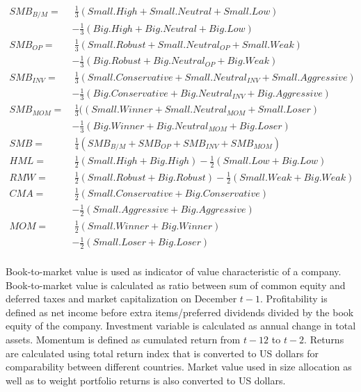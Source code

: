 \documentclass{article}
\begin{document}
\begin{equation} \label{eq:FF6factors}
\begin{split}
SMB_{B/M} = & \ \frac{1}{3} (Small.High + Small.Neutral + Small.Low) \\
			& - \frac{1}{3} (Big.High + Big.Neutral + Big.Low) \\[5pt]
SMB_{OP} = & \ \frac{1}{3} (Small.Robust + Small.Neutral_{OP} + Small.Weak)\\
			& - \frac{1}{3} (Big.Robust + Big.Neutral_{OP} + Big.Weak)\\[5pt]
SMB_{INV} = & \ \frac{1}{3} (Small.Conservative + Small.Neutral_{INV} + Small.Aggressive)\\
			& - \frac{1}{3} (Big.Conservative + Big.Neutral_{INV} + Big.Aggressive)\\[5pt]
SMB_{MOM} = & \ \frac{1}{3} ((Small.Winner + Small.Neutral_{MOM} + Small.Loser)\\
		     	& - \frac{1}{3} (Big.Winner + Big.Neutral_{MOM} + Big.Loser)\\[5pt]
SMB = & \ \frac{1}{4} (SMB_{B/M} + SMB_{OP} + SMB_{INV} + SMB_{MOM})\\[20pt]
HML = & \ \frac{1}{2} (Small.High + Big.High) - \frac{1}{2} (Small.Low + Big.Low)\\[5pt]
RMW = & \ \frac{1}{2} (Small.Robust + Big.Robust) - \frac{1}{2} (Small.Weak + Big.Weak)\\[5pt]
CMA = & \ \frac{1}{2} (Small.Conservative + Big.Conservative)\\
		& - \frac{1}{2} (Small.Aggressive + Big.Aggressive)\\[5pt]
MOM = & \ \frac{1}{2} (Small.Winner + Big.Winner)\\
		& - \frac{1}{2} (Small.Loser + Big.Loser)\\
\end{split}
\end{equation}

Book-to-market value is used as indicator of value characteristic of a company. Book-to-market value is calculated as ratio between sum of common equity and deferred taxes and market capitalization on December $t-1$. Profitability is defined as net income before extra items/preferred dividends divided by the book equity of the company. Investment variable is calculated as annual change in total assets. Momentum is defined as cumulated return from $t-12$ to $t-2$. Returns are calculated using total return index that is converted to US dollars for comparability between different countries. Market value used in size allocation as well as to weight portfolio returns is also converted to US dollars. \par
\end{document}
